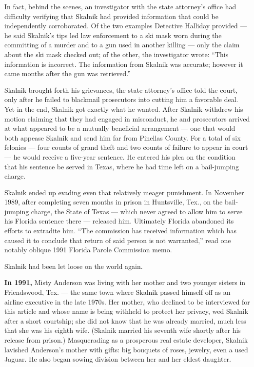 In fact, behind the scenes, an investigator with the state attorney's
office had difficulty verifying that Skalnik had provided information
that could be independently corroborated. Of the two examples Detective
Halliday provided --- he said Skalnik's tips led law enforcement to a
ski mask worn during the committing of a murder and to a gun used in
another killing --- only the claim about the ski mask checked out; of
the other, the investigator wrote: ``This information is incorrect. The
information from Skalnik was accurate; however it came months after the
gun was retrieved.''

Skalnik brought forth his grievances, the state attorney's office told
the court, only after he failed to blackmail prosecutors into cutting
him a favorable deal. Yet in the end, Skalnik got exactly what he
wanted. After Skalnik withdrew his motion claiming that they had engaged
in misconduct, he and prosecutors arrived at what appeared to be a
mutually beneficial arrangement --- one that would both appease Skalnik
and send him far from Pinellas County. For a total of six felonies ---
four counts of grand theft and two counts of failure to appear in court
--- he would receive a five-year sentence. He entered his plea on the
condition that his sentence be served in Texas, where he had time left
on a bail-jumping charge.

Skalnik ended up evading even that relatively meager punishment. In
November 1989, after completing seven months in prison in Huntsville,
Tex., on the bail-jumping charge, the State of Texas --- which never
agreed to allow him to serve his Florida sentence there --- released
him. Ultimately Florida abandoned its efforts to extradite him. ``The
commission has received information which has caused it to conclude that
return of said person is not warranted,'' read one notably oblique 1991
Florida Parole Commission memo.

Skalnik had been let loose on the world again.

\textbf{In 1991,} Misty Anderson was living with her mother and two
younger sisters in Friendswood, Tex. --- the same town where Skalnik
passed himself off as an airline executive in the late 1970s. Her
mother, who declined to be interviewed for this article and whose name
is being withheld to protect her privacy, wed Skalnik after a short
courtship; she did not know that he was already married, much less that
she was his eighth wife. (Skalnik married his seventh wife shortly after
his release from prison.) Masquerading as a prosperous real estate
developer, Skalnik lavished Anderson's mother with gifts: big bouquets
of roses, jewelry, even a used Jaguar. He also began sowing division
between her and her eldest daughter.


